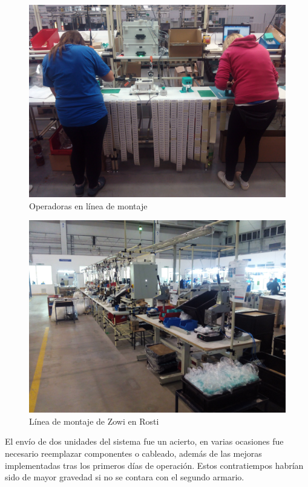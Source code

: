 \begin{figure}
\centering
\includegraphics[width=135mm]{Figures/conc2.jpg}
\caption[Operadoras en línea de montaje]{Operadoras en línea de montaje}
\label{fig:conc2}
\end{figure}

\begin{figure}
\centering
\includegraphics[width=135mm]{Figures/conc3.jpg}
\caption[Línea de montaje de Zowi en Rosti]{Línea de montaje de Zowi en Rosti}
\label{fig:conc3}
\end{figure}

El envío de dos unidades del sistema fue un acierto, en varias ocasiones fue necesario reemplazar componentes o cableado, además de las mejoras implementadas tras los primeros días de operación. Estos contratiempos habrían sido de mayor gravedad si no se contara con el segundo armario.

